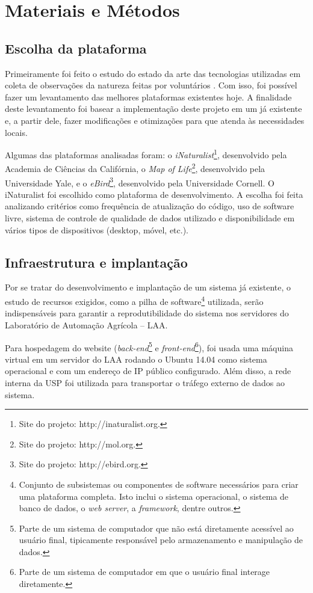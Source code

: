 \section{Materiais e Métodos}
\subsection{Escolha da plataforma}
Primeiramente foi feito o estudo do estado da arte das tecnologias utilizadas em coleta de observações da natureza feitas por voluntários \cite{azavea2014, azavea2015}. Com isso, foi possível fazer um levantamento das melhores plataformas existentes hoje. A finalidade deste levantamento foi basear a implementação deste projeto em um já existente e, a partir dele, fazer modificações e otimizações para que atenda às necessidades locais. 

Algumas das plataformas analisadas foram: o \emph{iNaturalist}\footnote{Site do projeto: http://inaturalist.org.}, desenvolvido pela Academia de Ciências da Califórnia, o \emph{Map of Life}\footnote{Site do projeto: http://mol.org.}, desenvolvido pela Universidade Yale, e o \emph{eBird}\footnote{Site do projeto: http://ebird.org.}, desenvolvido pela Universidade Cornell. O iNaturalist foi escolhido como plataforma de desenvolvimento. A escolha foi feita analizando critérios como frequência de atualização do código, uso de software livre, sistema de controle de qualidade de dados utilizado e disponibilidade em vários tipos de dispositivos (desktop, móvel, etc.).

\subsection{Infraestrutura e implantação}
Por se tratar do desenvolvimento e implantação de um sistema já existente, o estudo de recursos exigidos, como a pilha de software\footnote{Conjunto de subsistemas ou componentes de software necessários para criar uma plataforma completa. Isto inclui o sistema operacional, o sistema de banco de dados, o \emph{web server}, a \emph{framework}, dentre outros.} utilizada, serão indispensáveis para garantir a reprodutibilidade do sistema nos servidores do Laboratório de Automação Agrícola -- LAA.

Para hospedagem do website (\emph{back-end}\footnote{Parte de um sistema de computador que não está diretamente acessível ao usuário final, tipicamente responsável pelo armazenamento e manipulação de dados.} e \emph{front-end}\footnote{Parte de um sistema de computador em que o usuário final interage diretamente.}), foi usada uma máquina virtual em um servidor do LAA rodando o Ubuntu 14.04 como sistema operacional e com um endereço de IP público configurado. Além disso, a rede interna da USP foi utilizada para transportar o tráfego externo de dados ao sistema.

